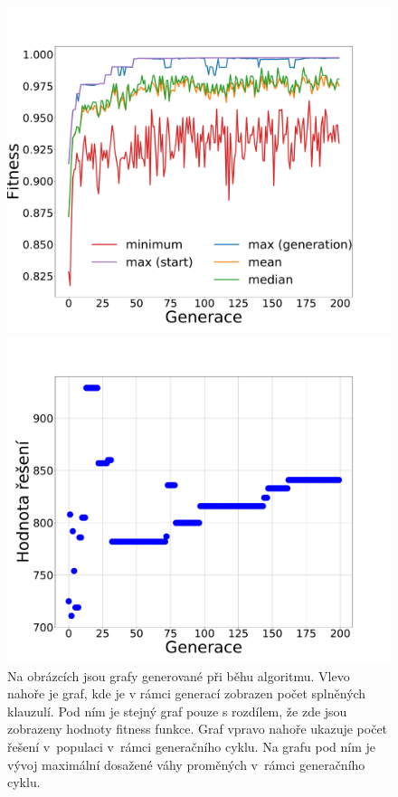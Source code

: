 \documentclass[11pt]{article}
\begin{document}
\begin{figure}
    \begin{minipage}[c]{0.48\textwidth}
        \centering \includegraphics[width=\textwidth]{img/runG.pdf} 
    \end{minipage}
    \begin{minipage}[c]{0.48\textwidth}
        \centering \includegraphics[width=\textwidth]{img/runW.pdf} 
    \end{minipage}
   \caption{Na obrázcích jsou grafy generované při běhu algoritmu. Vlevo nahoře je graf, kde je v rámci generací zobrazen počet splněných klauzulí. Pod ním je stejný graf pouze s rozdílem, že zde jsou zobrazeny hodnoty fitness funkce. Graf vpravo nahoře ukazuje počet řešení v~populaci v~rámci generačního cyklu. Na grafu pod ním je vývoj maximální dosažené váhy proměných v~rámci generačního cyklu.}\label{fig:normalrun}
\end{figure} 
\end{document}
